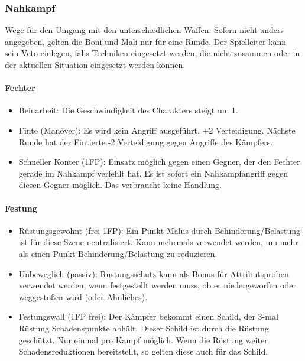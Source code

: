 \documentclass{article}
\begin{document}
\subsubsection{Nahkampf}

Wege für den Umgang mit den unterschiedlichen Waffen. Sofern nicht anders angegeben, gelten die Boni und Mali nur für
eine Runde. Der Spielleiter kann sein Veto einlegen, falls Techniken eingesetzt werden, die nicht zusammen oder in
der aktuellen Situation eingesetzt werden können.

\paragraph{Fechter}

\begin{itemize}
\item Beinarbeit: Die Geschwindigkeit des Charakters steigt um 1.
\item Finte (Manöver): Es wird kein Angriff ausgeführt. +2 Verteidigung. Nächste Runde hat der Fintierte -2 Verteidigung gegen Angriffe des Kämpfers.
\item Schneller Konter (1FP): Einsatz möglich gegen einen Gegner, der den Fechter gerade im Nahkampf verfehlt hat. Es ist sofort ein Nahkampfangriff gegen diesen Gegner möglich. Das verbraucht keine Handlung.
\end{itemize}

\paragraph{Festung}

\begin{itemize}
\item Rüstungsgewöhnt (frei 1FP): Ein Punkt Malus durch Behinderung/Belastung ist für diese Szene neutralisiert. Kann mehrmals verwendet werden, um mehr als einen Punkt Behinderung/Belastung zu reduzieren.
\item Unbeweglich (passiv): Rüstungsschutz kann als Bonus für Attributsproben verwendet werden, wenn festgestellt werden muss, ob er niedergeworfen oder weggestoßen wird (oder Ähnliches).
\item Festungswall (1FP frei): Der Kämpfer bekommt einen Schild, der 3-mal Rüstung Schadenspunkte abhält. Dieser Schild ist durch die Rüstung geschützt. Nur einmal pro Kampf möglich. Wenn die Rüstung weiter Schadensreduktionen bereitstellt, so gelten diese auch für das Schild.
\end{itemize}
\end{document}
